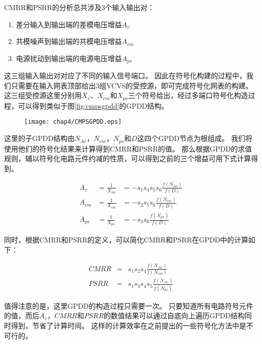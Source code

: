 CMRR和PSRR的分析总共涉及3个输入输出对：

\begin{enumerate}
	\item 差分输入到输出端的差模电压增益$A_v$
	\item 共模噪声到输出端的共模电压增益$A_{cm}$
	\item 电源扰动到输出端的电源电压增益$A_{ps}$
\end{enumerate}

这三组输入输出对对应了不同的输入信号端口。
因此在符号化构建的过程中，我们只需要在输入网表顶部给出3组VCVS的受控源，即可完成符号化网表的构建。
这三组受控源这里分别用$X_v$、$X_{cm}$和$X_{ps}$三个符号给出，经过多端口符号化构造过程，可以得到类似于图\ref{fig:cmpsgpdd}的GPDD结构。

\begin{figure}[!htp]
	\centering
	\texttt{[image: chap4/CMPSGPDD.eps]}
\end{figure}

这里的子GPDD结构由$N_{Av}$，$N_{cm}$，$N_{ps}$和$D$这四个GPDD节点为根组成。
我们将使用他们的符号化结果来计算得到CMRR和PSRR的值。
那么根据GPDD的求值规则，辅以符号化电路元件约减的性质，可以得到之前的三个增益可用下式计算得到。

\begin{eqnarray}
A_v     &= \frac{1}{X_{Av}} &= - s_1 s_4 s_5 s_6 \frac{f\left(N_{Av}\right)}{f\left(D\right)}\\
A_{cm}  &= \frac{1}{X_{cm}} &= - s_2 s_5 s_6 \frac{f\left(N_{cm}\right)}{f\left(D\right)}\\
A_{ps}  &= \frac{1}{X_{ps}} &= - s_3 s_6 \frac{f\left(N_{ps}\right)}{f\left(D\right)}
\end{eqnarray}

同时，根据CMRR和PSRR的定义，可以简化CMRR和PSRR在GPDD中的计算如下：

\begin{eqnarray}
CMRR &=& s_1 s_2 s_4 \frac{f\left(N_{Av}\right)}{f\left(N_{cm}\right)}\\
PSRR &=& s_1 s_3 s_4 s_5 \frac{f\left(N_{Av}\right)}{f\left(N_{ps}\right)}
\end{eqnarray}

值得注意的是，这里GPDD的构造过程只需要一次。
只要知道所有电路符号元件的值，而后$A_v$，$CMRR$和$PSRR$的数值结果可以通过自底向上遍历GPDD结构同时得到，节省了计算时间。
这样的计算效率在之前提出的一些符号化方法中是不可行的\parencite{Gielen-ISAAC-1989}。

